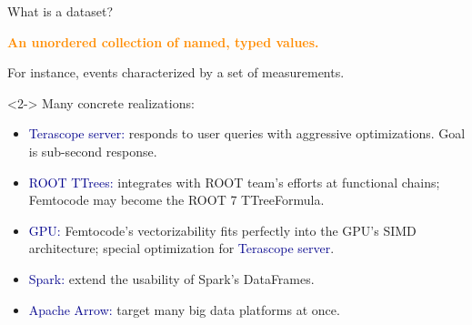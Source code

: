 \documentclass{beamer}
\begin{document}
\begin{frame}{What is a dataset?}
\vspace{0.25 cm}
\begin{center}
\begin{minipage}{0.9\linewidth}
\textcolor{darkorange}{\bf An unordered collection of named, typed values.}

\vspace{0.25 cm}
For instance, events characterized by a set of measurements.
\end{minipage}
\end{center}

\begin{uncoverenv}<2->
Many concrete realizations:
\begin{itemize}
\item \textcolor{darkblue}{Terascope server:} responds to user queries with aggressive optimizations. Goal is sub-second response.
\item \textcolor{darkblue}{ROOT TTrees:} integrates with ROOT team's efforts at functional chains; Femtocode may become the ROOT 7 TTreeFormula.
\item \textcolor{darkblue}{GPU:} Femtocode's vectorizability fits perfectly into the GPU's SIMD architecture; special optimization for \textcolor{darkblue}{Terascope server}.
\item \textcolor{darkblue}{Spark:} extend the usability of Spark's DataFrames.
\item \textcolor{darkblue}{Apache Arrow:} target many big data platforms at once.
\end{itemize}
\end{uncoverenv}
\end{frame}
\end{document}
